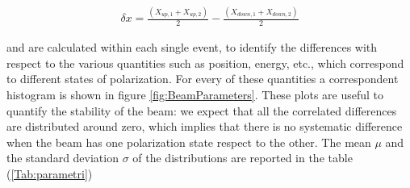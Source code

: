 \begin{align*}
\delta x =  \frac{(X_{up,1} + X_{up,2})}{2} - \frac{(X_{down,1} + X_{down,2})}{2}
\end{align*}

and are calculated within each single event, to identify the differences with respect to the various quantities such as position, energy, etc., which correspond to different states of polarization. For every of these quantities a correspondent histogram is shown in figure \ref{fig:BeamParameters}. These plots are useful to quantify the stability of the beam: we expect that all the correlated differences are distributed around zero, which implies that there is no systematic difference when the beam has one polarization state respect to the other. The mean $\mu$ and the standard deviation $\sigma$ of the distributions are reported in the table (\ref{Tab:parametri}) 

